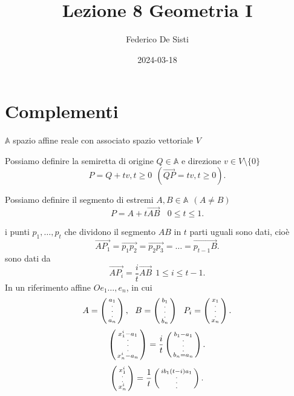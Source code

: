 \documentclass[12px]{article}
\title{Lezione 8 Geometria I}
\date{2024-03-18}
\author{Federico De Sisti}
\begin{document}
	\maketitle
	\newpage
	\section{Complementi}
	$ \mathbb{A} $ spazio affine reale con associato spazio vettoriale $V$\\
	\begin{defi}[Semiretta]
		Possiamo definire la semiretta di origine $Q\in \mathbb{A} $ e direzione $v\in V\setminus \{0\}$
		\[
		P = Q + tv, t\geq 0\ \ (\overrightarrow{QP} = tv, t\geq 0)
		.\] 
	\end{defi}
	\begin{defi}[Segmento]
		Possiamo definire il segmento di estremi $A, B\in \mathbb{A} \ \ (A\neq B) $
		\[
		P = A + t \overrightarrow{AB} \ \ \ \ 0\leq t\leq 1
		.\] 	
	\end{defi}
	i punti $p_1,\ldots,p_t$ che dividono il segmento $AB$ in $t$ parti uguali sono dati, cioè
\[
	\overrightarrow{AP_1} = \overrightarrow{p_1p_2} = \overrightarrow{p_2p_3} = \ldots = \overrightarrow{p_{t-1}B}
.\] 
sono dati da \[
	\overrightarrow{AP_i} = \frac{i}{t}\overrightarrow{AB} \ \ 1 \leq i\leq t-1
.\] 
	In un riferimento affine $Oe_1\ldots,e_n$, in cui
	\[
		A = \icol{a_1\\ . \\.\\.\\ a_n}, \ \ B = \icol{b_1\\ .\\.\\.\\b_n} \ \ P_i = \icol{x_1\\.\\.\\.\\ x_n}
	.\] 
	\[
		\left(\begin{smallmatrix}x_1^i - a_1\\.\\.\\.\\x_n^i - a_n\end{smallmatrix}\right) = \frac{i}{t}\left(\begin{smallmatrix}b_1-a_1\\.\\.\\.\\ b_n = a_n\end{smallmatrix}\right)
	.\] 
	\[
		\left(\begin{smallmatrix}x_1^i\\.\\.\\x_n^i\end{smallmatrix}\right) = \frac{1}{t}\left(\begin{smallmatrix}ib_1 (t - i)a_1\\.\\.\\.\end{smallmatrix}\right)
	.\] 
\end{document}
